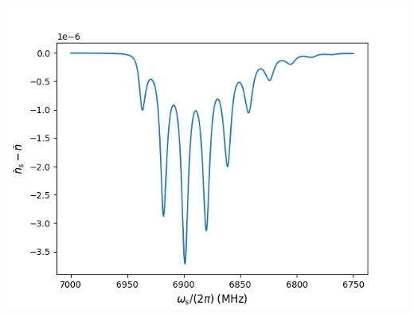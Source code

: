 \documentclass[12pt,hyperref={CJKbookmarks=true}]{beamer}
\begin{document}
\begin{frame}[t]
\begin{itemize}
\begin{columns}
\begin{column}{0.5\linewidth}
    \includegraphics[width=\linewidth]{figure/nbar_2.png}
\end{column}
\end{columns}
\end{itemize}
\end{frame}
\end{document}
